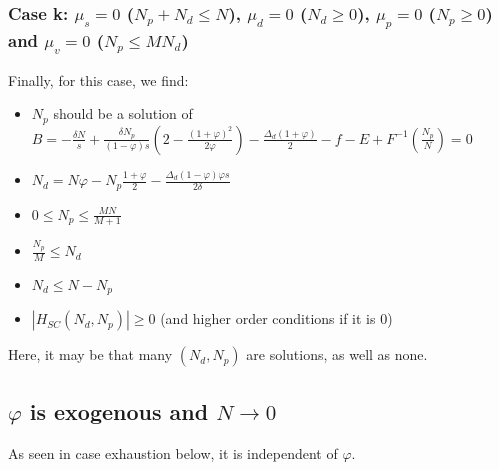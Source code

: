 \documentclass[english, a4paper]{article}
\theoremstyle{plain}
\theoremstyle{definition}
\theoremstyle{remark}
\begin{document}
    \subsubsection{Case k: $\mu_s = 0$ ($N_p + N_d \leq N$), $\mu_d = 0$ ($N_d \geq 0$), $\mu_p = 0$ ($N_p \geq 0$) and $\mu_v = 0$ ($N_p \leq MN_d$)}

    Finally, for this case, we find:

    \begin{itemize}
        \item $N_p$ should be a solution of $B = -\frac{\delta N}{s} + \frac{\delta N_p}{(1-\varphi)s} \left( 2 - \frac{(1+\varphi)^2}{2\varphi} \right) - \frac{\Delta_d (1+\varphi)}{2} - f - E + F^{-1}\left( \frac{N_p}{N} \right) = 0$
        \item $N_d = N\varphi - N_p\frac{1+\varphi}{2} - \frac{\Delta_d (1-\varphi)\varphi s}{2\delta}$
        \item $0 \leq N_p \leq \frac{MN}{M+1}$
        \item $\frac{N_p}{M} \leq N_d$
        \item $N_d \leq N - N_p$
        \item $|H_{SC}(N_d, N_p)| \geq 0$ (and higher order conditions if it is $0$)
    \end{itemize}

    Here, it may be that many $(N_d, N_p)$ are solutions, as well as none.

    \subsection{$\varphi$ is exogenous and $N \rightarrow 0$}

    As seen in case exhaustion below, it is independent of $\varphi$.
    
\end{document}

